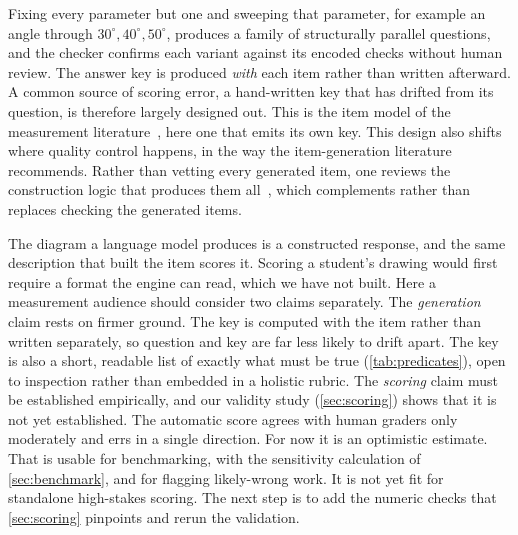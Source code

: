 Fixing every parameter but one and sweeping that parameter, for example an angle through $30^\circ, 40^\circ, 50^\circ$, produces a family of structurally parallel questions, and the checker confirms each variant against its encoded checks without human review. The answer key is produced \emph{with} each item rather than written afterward. A common source of scoring error, a hand-written key that has drifted from its question, is therefore largely designed out. This is the item model of the measurement literature~\citep{gierl2012itemmodels}, here one that emits its own key. This design also shifts where quality control happens, in the way the item-generation literature recommends. Rather than vetting every generated item, one reviews the construction logic that produces them all~\citep{gierl2016review}, which complements rather than replaces checking the generated items.

The diagram a language model produces is a constructed response, and the same description that built the item scores it. Scoring a student's drawing would first require a format the engine can read, which we have not built. Here a measurement audience should consider two claims separately. The \emph{generation} claim rests on firmer ground. The key is computed with the item rather than written separately, so question and key are far less likely to drift apart. The key is also a short, readable list of exactly what must be true (\cref{tab:predicates}), open to inspection rather than embedded in a holistic rubric. The \emph{scoring} claim must be established empirically, and our validity study (\cref{sec:scoring}) shows that it is not yet established. The automatic score agrees with human graders only moderately and errs in a single direction. For now it is an optimistic estimate. That is usable for benchmarking, with the sensitivity calculation of \cref{sec:benchmark}, and for flagging likely-wrong work. It is not yet fit for standalone high-stakes scoring. The next step is to add the numeric checks that \cref{sec:scoring} pinpoints and rerun the validation.

